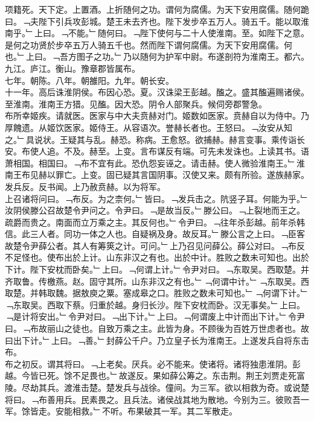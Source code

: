 \documentclass{zhvt-classic}
\begin{document}
\hspace*{2em}项籍死。天下定。上置酒。上折随何之功。谓何为腐儒。为天下安用腐儒。随何跪曰。﹁夫陛下引兵攻彭城。楚王未去齐也。陛下发步卒五万人。骑五千。能以取淮南乎。﹂上曰。﹁不能。﹂随何曰。﹁陛下使何与二十人使淮南。至。如陛下之意。是何之功贤於步卒五万人骑五千也。然而陛下谓何腐儒。为天下安用腐儒。何也。﹂上曰。﹁吾方图子之功。﹂乃以随何为护军中尉。布遂剖符为淮南王。都六。九江。庐江。衡山。豫章郡皆属布。\\
\hspace*{2em}七年。朝陈。八年。朝雒阳。九年。朝长安。\\
\hspace*{2em}十一年。高后诛淮阴侯。布因心恐。夏。汉诛梁王彭越。醢之。盛其醢遍赐诸侯。至淮南。淮南王方猎。见醢。因大恐。阴令人部聚兵。候伺旁郡警急。\\
\hspace*{2em}布所幸姬疾。请就医。医家与中大夫贲赫对门。姬数如医家。贲赫自以为侍中。乃厚餽遗。从姬饮医家。姬侍王。从容语次。誉赫长者也。王怒曰。﹁汝安从知之。﹂具说状。王疑其与乱。赫恐。称病。王愈怒。欲捕赫。赫言变事。乘传诣长安。布使人追。不及。赫至。上变。言布谋反有端。可先未发诛也。上读其书。语萧相国。相国曰。﹁布不宜有此。恐仇怨妄诬之。请击赫。使人微验淮南王。﹂淮南王布见赫以罪亡。上变。固已疑其言国阴事。汉使又来。颇有所验。遂族赫家。发兵反。反书闻。上乃赦贲赫。以为将军。\\
\hspace*{2em}上召诸将问曰。﹁布反。为之柰何。﹂皆曰。﹁发兵击之。阬竖子耳。何能为乎。﹂汝阴侯滕公召故楚令尹问之。令尹曰。﹁是故当反。﹂滕公曰。﹁上裂地而王之。疏爵而贵之。南面而立万乘之主。其反何也。﹂令尹曰。﹁往年杀彭越。前年杀韩信。此三人者。同功一体之人也。自疑祸及身。故反耳。﹂滕公言之上曰。﹁臣客故楚令尹薛公者。其人有筹筴之计。可问。﹂上乃召见问薛公。薛公对曰。﹁布反不足怪也。使布出於上计。山东非汉之有也。出於中计。胜败之数未可知也。出於下计。陛下安枕而卧矣。﹂上曰。﹁何谓上计。﹂令尹对曰。﹁东取吴。西取楚。并齐取鲁。传檄燕。赵。固守其所。山东非汉之有也。﹂﹁何谓中计。﹂﹁东取吴。西取楚。并韩取魏。据敖庾之粟。塞成皋之口。胜败之数未可知也。﹂﹁何谓下计。﹂﹁东取吴。西取下蔡。归重於越。身归长沙。陛下安枕而卧。汉无事矣。﹂上曰。﹁是计将安出。﹂令尹对曰。﹁出下计。﹂上曰。﹁何谓废上中计而出下计。﹂令尹曰。﹁布故丽山之徒也。自致万乘之主。此皆为身。不顾後为百姓万世虑者也。故曰出下计。﹂上曰。﹁善。﹂封薛公千户。乃立皇子长为淮南王。上遂发兵自将东击布。\\
\hspace*{2em}布之初反。谓其将曰。﹁上老矣。厌兵。必不能来。使诸将。诸将独患淮阴。彭越。今皆已死。馀不足畏也。﹂故遂反。果如薛公筹之。东击荆。荆王刘贾走死富陵。尽劫其兵。渡淮击楚。楚发兵与战徐。僮间。为三军。欲以相救为奇。或说楚将曰。﹁布善用兵。民素畏之。且兵法。诸侯战其地为散地。今别为三。彼败吾一军。馀皆走。安能相救。﹂不听。布果破其一军。其二军散走。\\
\end{document}
